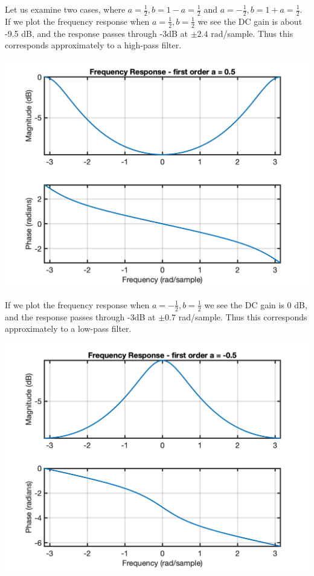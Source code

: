 \begin{example}
Let us examine two cases, where $a = \tfrac{1}{2}, b=1-a = \tfrac{1}{2}$ and $a = -\tfrac{1}{2}, b=1+a = \tfrac{1}{2}$. If we plot the frequency response when $a = \tfrac{1}{2}, b=\tfrac{1}{2}$ we see the DC gain is about -9.5 dB, and the response passes through -3dB at $\pm 2.4$ rad/sample. Thus this corresponds approximately to a high-pass filter. 
\begin{center}   
  \includegraphics[scale=0.7]{graphics/lecture25_1.png}
\end{center}
If we plot the frequency response when $a = -\tfrac{1}{2}, b=\tfrac{1}{2}$ we see the DC gain is 0 dB, and the response passes through -3dB at $\pm 0.7$ rad/sample. Thus this corresponds approximately to a low-pass filter. 
\begin{center}   
  \includegraphics[scale=0.7]{graphics/lecture25_2.png}
\end{center}

\end{example}

